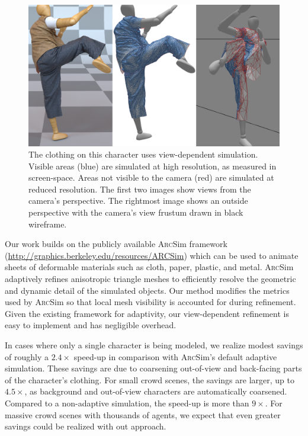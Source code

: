 \documentclass[10pt,journal,compsoc,twoside]{TexInputs/IEEEtran}
\newcommand{\rahul}[1]{\textcolor{blue}{(#1 ---Rahul)}}
\newcommand{\arcsim}{\textsc{Arc}Sim\xspace}
\begin{document}
\begin{figure}[t]
	\vspace*{-.05in}
    \centering
    \includegraphics[width=1.0\columnwidth]{karate/karate}
	\vspace*{-.2in}
    \caption{The clothing on this character uses view-dependent simulation.  
	Visible areas (blue) are simulated at high resolution, as measured in screen-space.  
	Areas not visible to the camera (red) are simulated at reduced resolution.
    The first two images show views from the camera's perspective.  The rightmost image 
	shows an outside perspective with the camera's view frustum drawn in black wireframe. 
}
    \label{fig:teaser}
	\vspace*{-.20in}
\end{figure}

Our work builds on the publicly available \arcsim
framework (\url{http://graphics.berkeley.edu/resources/ARCSim}) which
can be used to animate sheets of deformable materials such as cloth, paper,
plastic, and metal. \arcsim adaptively refines anisotropic triangle meshes to
efficiently resolve the geometric and dynamic detail of the simulated objects.
Our method modifies the metrics used by \arcsim so that local mesh visibility
is accounted for during refinement. Given the existing framework for adaptivity,
our view-dependent refinement is easy to implement and has negligible overhead.

In cases where only a single character is being modeled, we realize modest savings of roughly a $2.4\times$ speed-up in comparison with \arcsim's
default adaptive simulation. These savings are due to coarsening out-of-view and back-facing parts of the character's clothing. For small crowd
scenes, the savings are larger, up to $4.5\times$, as background and out-of-view characters are automatically coarsened. Compared to a non-adaptive
simulation, the speed-up is more than $9\times$. For massive crowd scenes with thousands of agents, we expect that even greater savings could be
realized with out approach.
\end{document}
